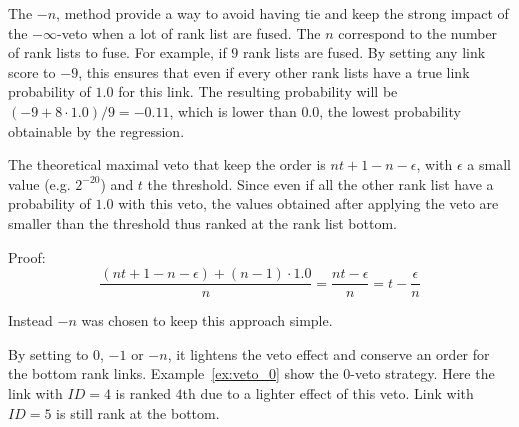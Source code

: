 The $-n$, method provide a way to avoid having tie and keep the strong impact of the $-\infty$-veto when a lot of rank list are fused.
The $n$ correspond to the number of rank lists to fuse.
For example, if $9$ rank lists are fused.
By setting any link score to $-9$, this ensures that even if every other rank lists have a true link probability of $1.0$ for this link.
The resulting probability will be $(-9 + 8 \cdot 1.0) / 9 = -0.11$, which is lower than $0.0$, the lowest probability obtainable by the regression.

The theoretical maximal veto that keep the order is $nt + 1 - n - \epsilon$, with $\epsilon$ a small value (e.g. $2^{-20}$) and $t$ the threshold.
Since even if all the other rank list have a probability of $1.0$ with this veto, the values obtained after applying the veto are smaller than the threshold thus ranked at the rank list bottom.

Proof:
$$\frac{(nt + 1 - n - \epsilon) + (n - 1) \cdot 1.0}{n} = \frac{nt - \epsilon}{n} = t - \frac{\epsilon}{n}$$

Instead $-n$ was chosen to keep this approach simple.

By setting to $0$, $-1$ or $-n$, it lightens the veto effect and conserve an order for the bottom rank links.
Example~\ref{ex:veto_0} show the $0$-veto strategy.
Here the link with $ID = 4$ is ranked $4$th due to a lighter effect of this veto.
Link with $ID = 5$ is still rank at the bottom.


